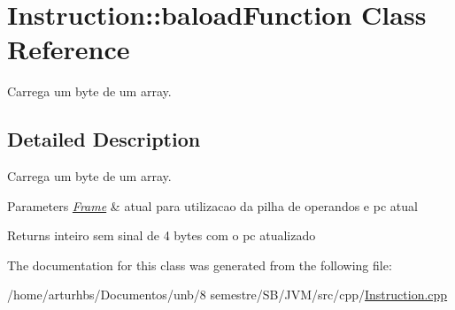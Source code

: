 \hypertarget{classInstruction_1_1baloadFunction}{}\section{Instruction\+:\+:baload\+Function Class Reference}
\label{classInstruction_1_1baloadFunction}


Carrega um byte de um array.  




\subsection{Detailed Description}
Carrega um byte de um array. 


\begin{DoxyParams}{Parameters}
{\em \hyperlink{classFrame}{Frame}} & atual para utilizacao da pilha de operandos e pc atual \\
\hline
\end{DoxyParams}
\begin{DoxyReturn}{Returns}
inteiro sem sinal de 4 bytes com o pc atualizado 
\end{DoxyReturn}


The documentation for this class was generated from the following file\+:\begin{DoxyCompactItemize}
\item 
/home/arturhbs/\+Documentos/unb/8 semestre/\+S\+B/\+J\+V\+M/src/cpp/\hyperlink{Instruction_8cpp}{Instruction.\+cpp}\end{DoxyCompactItemize}
